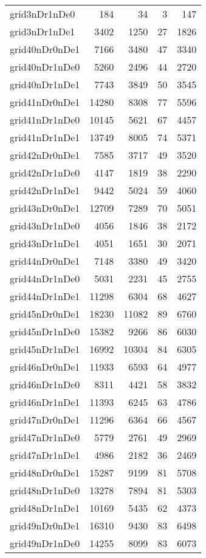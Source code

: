 \begin{longtable}{lrrrr}
grid3nDr1nDe0 & 184 & 34 & 3 & 147 \\
grid3nDr1nDe1 & 3402 & 1250 & 27 & 1826 \\
grid40nDr0nDe1 & 7166 & 3480 & 47 & 3340 \\
grid40nDr1nDe0 & 5260 & 2496 & 44 & 2720 \\
grid40nDr1nDe1 & 7743 & 3849 & 50 & 3545 \\
grid41nDr0nDe1 & 14280 & 8308 & 77 & 5596 \\
grid41nDr1nDe0 & 10145 & 5621 & 67 & 4457 \\
grid41nDr1nDe1 & 13749 & 8005 & 74 & 5371 \\
grid42nDr0nDe1 & 7585 & 3717 & 49 & 3520 \\
grid42nDr1nDe0 & 4147 & 1819 & 38 & 2290 \\
grid42nDr1nDe1 & 9442 & 5024 & 59 & 4060 \\
grid43nDr0nDe1 & 12709 & 7289 & 70 & 5051 \\
grid43nDr1nDe0 & 4056 & 1846 & 38 & 2172 \\
grid43nDr1nDe1 & 4051 & 1651 & 30 & 2071 \\
grid44nDr0nDe1 & 7148 & 3380 & 49 & 3420 \\
grid44nDr1nDe0 & 5031 & 2231 & 45 & 2755 \\
grid44nDr1nDe1 & 11298 & 6304 & 68 & 4627 \\
grid45nDr0nDe1 & 18230 & 11082 & 89 & 6760 \\
grid45nDr1nDe0 & 15382 & 9266 & 86 & 6030 \\
grid45nDr1nDe1 & 16992 & 10304 & 84 & 6305 \\
grid46nDr0nDe1 & 11933 & 6593 & 64 & 4977 \\
grid46nDr1nDe0 & 8311 & 4421 & 58 & 3832 \\
grid46nDr1nDe1 & 11393 & 6245 & 63 & 4786 \\
grid47nDr0nDe1 & 11296 & 6364 & 66 & 4567 \\
grid47nDr1nDe0 & 5779 & 2761 & 49 & 2969 \\
grid47nDr1nDe1 & 4986 & 2182 & 36 & 2469 \\
grid48nDr0nDe1 & 15287 & 9199 & 81 & 5708 \\
grid48nDr1nDe0 & 13278 & 7894 & 81 & 5303 \\
grid48nDr1nDe1 & 10169 & 5435 & 62 & 4373 \\
grid49nDr0nDe1 & 16310 & 9430 & 83 & 6498 \\
grid49nDr1nDe0 & 14255 & 8099 & 83 & 6073 \\

\end{longtable}
